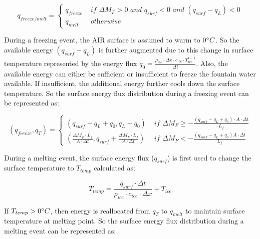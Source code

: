 \documentclass[utf8]{frontiersSCNS} %
\begin{document}
\begin{equation}
	q_{freeze/melt} = \left\{ \begin{array}{ll}
		q_{freeze} & \textit{ if } \Delta M_{F} > 0 \textit{ and } q_{surf} < 0 \textit{ and }(q_{surf}-q_{L}) < 0 \\
		q_{melt}   & \textit{ otherwise}
	\end{array} \right.
\end{equation}

During a freezing event, the AIR surface is assumed to warm to $0 \degree C$. So the available energy $(q_{surf}-q_{L})$
is further augmented due to this change in surface temperature represented by the energy flux $q_{0} = \frac{\rho_{ice}
		\cdot \Delta x \cdot c_{ice} \cdot T_{ice}^{i-1}}{\Delta t}$. Also, the available energy can either be sufficient or
insufficient to freeze the fountain water available.  If insufficient, the additional energy further cools down the
surface temperature. So the surface energy flux distribution during a freezing event can be represented as:

\begin{equation}
	(q_{freeze}, q_{T}) = \left\{ \begin{array}{ll}
		(q_{surf}-q_{L}+q_{0}, q_{L}-q_{0}) & \textit{ if } \Delta M_{F} \geq -\frac{(q_{surf}-q_{L}+q_{0}) \cdot A \cdot \Delta
		t}{L_f}                                                                                                                  \\
		(\frac{\Delta M_{F} \cdot L_f
		}{A \cdot \Delta t}
		, q_{surf}+\frac{\Delta M_{F} \cdot L_f
		}{A \cdot \Delta t})                & \textit{ if } \Delta M_{F} < -\frac{(q_{surf}-q_{L}+q_0) A \cdot \Delta
		t}{L_f}
	\end{array} \right.
\end{equation}

During a melting event, the surface energy flux ($q_{surf}$) is first used to change the surface temperature to
$T_{temp}$ calculated as:

\begin{equation} T_{temp} =\frac{q_{surf} \cdot \Delta t}{\rho_{ice} \cdot c_{ice} \cdot \Delta x} + T_{ice} \end{equation}

If $T_{temp} > 0 \degree C$, then energy is reallocated from $q_{T}$ to $q_{melt}$ to maintain surface temperature at
melting point. So the surface energy flux distribution during a melting event can be represented as:
\end{document}
